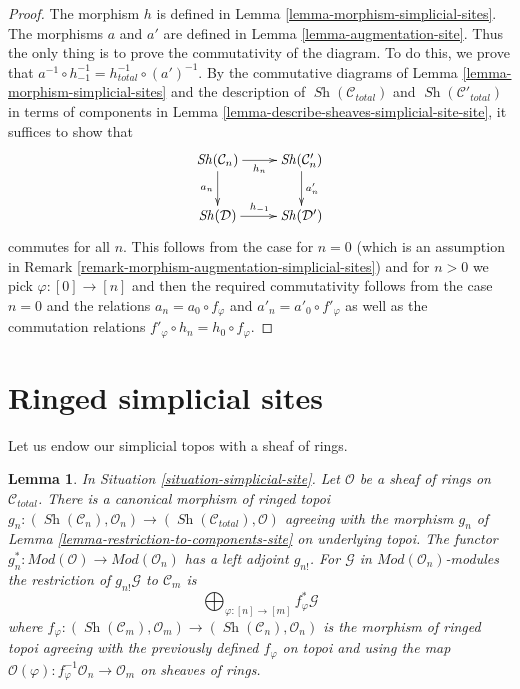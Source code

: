 \documentclass{stacks-project}
\theoremstyle{plain}
\newtheorem{lemma}[subsection]{Lemma}
\theoremstyle{definition}
\theoremstyle{remark}
\numberwithin{equation}{subsection}
\def\Sh{\mathop{\mathit{Sh}}\nolimits}
\begin{document}
\begin{proof}
The morphism $h$ is defined in Lemma \ref{lemma-morphism-simplicial-sites}.
The morphisms $a$ and $a'$ are defined in Lemma \ref{lemma-augmentation-site}.
Thus the only thing is to prove the commutativity of the diagram.
To do this, we prove that
$a^{-1} \circ h_{-1}^{-1} = h_{total}^{-1} \circ (a')^{-1}$.
By the commutative diagrams of
Lemma \ref{lemma-morphism-simplicial-sites}
and the description of $\Sh(\mathcal{C}_{total})$
and $\Sh(\mathcal{C}'_{total})$ in terms of components
in Lemma \ref{lemma-describe-sheaves-simplicial-site-site},
it suffices to show that
$$
\xymatrix{
\Sh(\mathcal{C}_n) \ar[d]_{a_n} \ar[r]_{h_n} &
\Sh(\mathcal{C}'_n) \ar[d]^{a'_n} \\
\Sh(\mathcal{D}) \ar[r]^{h_{-1}} &
\Sh(\mathcal{D}')
}
$$
commutes for all $n$. This follows from the case for $n = 0$
(which is an assumption in
Remark \ref{remark-morphism-augmentation-simplicial-sites})
and for $n > 0$ we pick $\varphi : [0] \to [n]$
and then the required commutativity follows from the case $n = 0$
and the relations $a_n = a_0 \circ f_\varphi$
and $a'_n = a'_0 \circ f'_\varphi$
as well as the commutation relations
$f'_\varphi \circ h_n = h_0 \circ f_\varphi$.
\end{proof}




\section{Ringed simplicial sites}
\label{section-simplicial-sites-modules}

\noindent
Let us endow our simplicial topos with a sheaf of rings.

\begin{lemma}
\label{lemma-restriction-module-to-components-site}
In Situation \ref{situation-simplicial-site}. Let $\mathcal{O}$
be a sheaf of rings on $\mathcal{C}_{total}$.
There is a canonical morphism of ringed topoi
$g_n : (\Sh(\mathcal{C}_n), \mathcal{O}_n) \to
(\Sh(\mathcal{C}_{total}), \mathcal{O})$
agreeing with the morphism $g_n$ of
Lemma \ref{lemma-restriction-to-components-site} on underlying topoi.
The functor
$g_n^* : \textit{Mod}(\mathcal{O}) \to \textit{Mod}(\mathcal{O}_n)$
has a left adjoint $g_{n!}$.
For $\mathcal{G}$ in $\textit{Mod}(\mathcal{O}_n)$-modules the
restriction of $g_{n!}\mathcal{G}$ to $\mathcal{C}_m$ is
$$
\bigoplus\nolimits_{\varphi : [n] \to [m]} f_\varphi^*\mathcal{G}
$$
where $f_\varphi : (\Sh(\mathcal{C}_m), \mathcal{O}_m) \to
(\Sh(\mathcal{C}_n), \mathcal{O}_n)$ is the morphism of ringed topoi
agreeing with the previously defined $f_\varphi$ on topoi and
using the map
$\mathcal{O}(\varphi) : f_\varphi^{-1}\mathcal{O}_n \to \mathcal{O}_m$
on sheaves of rings.
\end{lemma}
\end{document}

